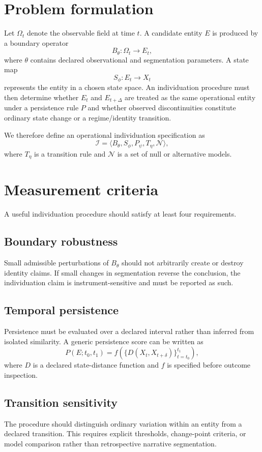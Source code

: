 \documentclass[11pt]{article}
\begin{document}
\section{Problem formulation}
Let $\Omega_t$ denote the observable field at time $t$. A candidate entity $E$ is produced by a boundary operator
\[
B_{\theta}: \Omega_t \rightarrow E_t,
\]
where $\theta$ contains declared observational and segmentation parameters. A state map
\[
S_{\phi}: E_t \rightarrow X_t
\]
represents the entity in a chosen state space. An individuation procedure must then determine whether $E_t$ and $E_{t+\Delta}$ are treated as the same operational entity under a persistence rule $P$ and whether observed discontinuities constitute ordinary state change or a regime/identity transition.

We therefore define an operational individuation specification as
\[
\mathcal{I}=\langle B_{\theta},S_{\phi},P_{\psi},T_{\eta},\mathcal{N}\rangle,
\]
where $T_{\eta}$ is a transition rule and $\mathcal{N}$ is a set of null or alternative models.

\section{Measurement criteria}
A useful individuation procedure should satisfy at least four requirements.

\subsection{Boundary robustness}
Small admissible perturbations of $B_{\theta}$ should not arbitrarily create or destroy identity claims. If small changes in segmentation reverse the conclusion, the individuation claim is instrument-sensitive and must be reported as such.

\subsection{Temporal persistence}
Persistence must be evaluated over a declared interval rather than inferred from isolated similarity. A generic persistence score can be written as
\[
P(E;t_0,t_1)=f\left(\{D(X_t,X_{t+\delta})\}_{t=t_0}^{t_1}\right),
\]
where $D$ is a declared state-distance function and $f$ is specified before outcome inspection.

\subsection{Transition sensitivity}
The procedure should distinguish ordinary variation within an entity from a declared transition. This requires explicit thresholds, change-point criteria, or model comparison rather than retrospective narrative segmentation.
\end{document}
